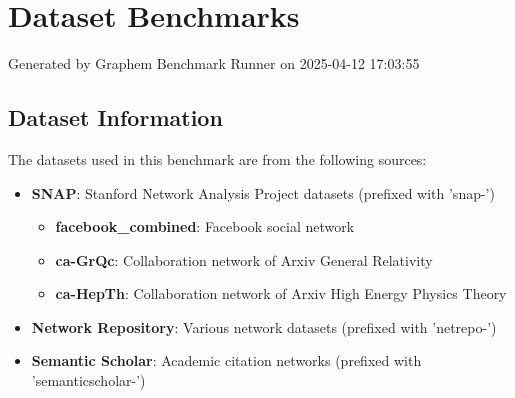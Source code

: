 \documentclass{article}
\begin{document}
\section*{Dataset Benchmarks}
Generated by Graphem Benchmark Runner on 2025-04-12 17:03:55
\subsection*{Dataset Information}
The datasets used in this benchmark are from the following sources:
\begin{itemize}
\item \textbf{SNAP}: Stanford Network Analysis Project datasets (prefixed with 'snap-')
  \begin{itemize}
  \item \textbf{facebook\_combined}: Facebook social network
  \item \textbf{ca-GrQc}: Collaboration network of Arxiv General Relativity
  \item \textbf{ca-HepTh}: Collaboration network of Arxiv High Energy Physics Theory
  \end{itemize}
\item \textbf{Network Repository}: Various network datasets (prefixed with 'netrepo-')
\item \textbf{Semantic Scholar}: Academic citation networks (prefixed with 'semanticscholar-')
\end{itemize}
\end{document}

